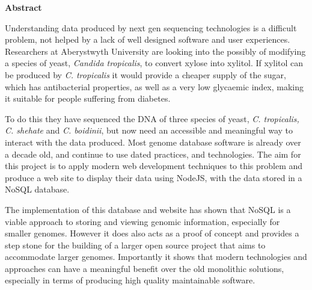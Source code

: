 \thispagestyle{empty}

\begin{center}
    {\LARGE\bf Abstract}
\end{center}

Understanding data produced by next gen sequencing technologies is a difficult problem, not helped by a lack of well designed software and user experiences. Researchers at Aberystwyth University are looking into the possibly of modifying a species of yeast, \textit{Candida tropicalis}, to convert xylose into xylitol.  If xylitol can be produced by \textit{C. tropicalis} it would provide a cheaper supply of the sugar, which has antibacterial properties, as well as a very low glycaemic index, making it suitable for people suffering from diabetes.

To do this they have sequenced the DNA of three species of yeast, \textit{C. tropicalis, C. shehate} and \textit{C. boidinii}, but now need an accessible and meaningful way to interact with the data produced. Most genome database software is already over a decade old, and continue to use dated practices, and technologies. The aim for this project is to apply modern web development techniques to this problem and produce a web site to display their data using NodeJS, with the data stored in a NoSQL database. 

The implementation of this database and website has shown that NoSQL is a viable approach to storing and viewing genomic information, especially for smaller genomes. However it does also acts as a proof of concept and provides a step stone for the building of a larger open source project that aims to accommodate larger genomes. Importantly it shows that modern technologies and approaches can have a meaningful benefit over the old monolithic solutions, especially in terms of producing high quality maintainable software.
